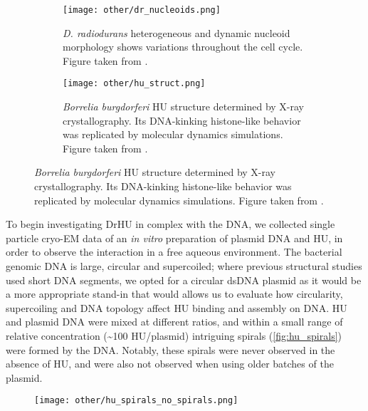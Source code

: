 \begin{figure}[ht]
    \centering
    \begin{subfigure}[B]{.48\textwidth}
        \centering
        \texttt{[image: other/dr\_nucleoids.png]}
        \caption{\textit{D. radiodurans} heterogeneous and dynamic nucleoid morphology shows variations throughout the cell cycle. Figure taken from \citet{flochCellMorphologyNucleoid2019}.}
        \label{fig:hu_nucleoids}
    \end{subfigure}%
    \hfill
    \begin{subfigure}[B]{.5\textwidth}
        \centering
        \texttt{[image: other/hu\_struct.png]}
        \caption{\textit{Borrelia burgdorferi} HU structure determined by X-ray crystallography. Its DNA-kinking histone-like behavior was replicated by molecular dynamics simulations. Figure taken from \citet{hognonMolecularBasesDNA2019}.}
        \label{fig:hu_structure}
    \end{subfigure}%
    \label{fig:hu}
\end{figure}

To begin investigating DrHU in complex with the DNA, we collected single particle cryo-EM data of an \textit{in vitro} preparation of plasmid DNA and HU, in order to observe the interaction in a free aqueous environment.
The bacterial genomic DNA is large, circular and supercoiled; where previous structural studies used short DNA segments, we opted for a circular dsDNA plasmid as it would be a more appropriate stand-in that would allows us to evaluate how circularity, supercoiling and DNA topology affect HU binding and assembly on DNA.
HU and plasmid DNA were mixed at different ratios, and within a small range of relative concentration (\sim100 HU/plasmid) intriguing spirals (\autoref{fig:hu_spirals}) were formed by the DNA.
Notably, these spirals were never observed in the absence of HU, and were also not observed when using older batches of the plasmid. %

\begin{figure}[ht]
    \centering
    \texttt{[image: other/hu\_spirals\_no\_spirals.png]}
    \label{fig:hu_spirals}
\end{figure}

